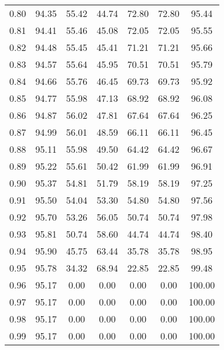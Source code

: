\begin{tabular}{|c|c|c|c|c|c|c|}
      0.80 &     94.35 &     55.42 &      44.74 &   72.80 &      72.80 &         95.44 \\
      0.81 &     94.41 &     55.46 &      45.08 &   72.05 &      72.05 &         95.55 \\
      0.82 &     94.48 &     55.45 &      45.41 &   71.21 &      71.21 &         95.66 \\
      0.83 &     94.57 &     55.64 &      45.95 &   70.51 &      70.51 &         95.79 \\
      0.84 &     94.66 &     55.76 &      46.45 &   69.73 &      69.73 &         95.92 \\
      0.85 &     94.77 &     55.98 &      47.13 &   68.92 &      68.92 &         96.08 \\
      0.86 &     94.87 &     56.02 &      47.81 &   67.64 &      67.64 &         96.25 \\
      0.87 &     94.99 &     56.01 &      48.59 &   66.11 &      66.11 &         96.45 \\
      0.88 &     95.11 &     55.98 &      49.50 &   64.42 &      64.42 &         96.67 \\
      0.89 &     95.22 &     55.61 &      50.42 &   61.99 &      61.99 &         96.91 \\
      0.90 &     95.37 &     54.81 &      51.79 &   58.19 &      58.19 &         97.25 \\
      0.91 &     95.50 &     54.04 &      53.30 &   54.80 &      54.80 &         97.56 \\
      0.92 &     95.70 &     53.26 &      56.05 &   50.74 &      50.74 &         97.98 \\
      0.93 &     95.81 &     50.74 &      58.60 &   44.74 &      44.74 &         98.40 \\
      0.94 &     95.90 &     45.75 &      63.44 &   35.78 &      35.78 &         98.95 \\
      0.95 &     95.78 &     34.32 &      68.94 &   22.85 &      22.85 &         99.48 \\
      0.96 &     95.17 &      0.00 &       0.00 &    0.00 &       0.00 &        100.00 \\
      0.97 &     95.17 &      0.00 &       0.00 &    0.00 &       0.00 &        100.00 \\
      0.98 &     95.17 &      0.00 &       0.00 &    0.00 &       0.00 &        100.00 \\
      0.99 &     95.17 &      0.00 &       0.00 &    0.00 &       0.00 &        100.00 \\
\bottomrule
\end{tabular}
